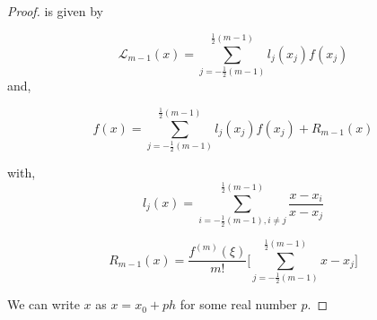 \documentclass[../document.tex]{subfiles}
\begin{document}
\begin{appendices}
\begin{proof}
			
			
			
			is given by
			
			
			\begin{equation} 
				\mathcal{L}_{m-1}(x) = 
				\sum_{ j=-\frac{1}{2}(m-1) }^{ \frac{1}{2}(m-1) } 
				l_j(x_j) f(x_j)
			\end{equation}
			and,
			
			\begin{equation} \label{main_eqn}
				f(x) =  
				\sum_{ j=-\frac{1}{2}(m-1) }^{ \frac{1}{2}(m-1) } 
				l_j(x_j) f(x_j) + R_{m-1}(x)
			\end{equation}
			
			
			with,
			\begin{equation*} 
				l_j(x) = 
				\sum_{i = -\frac{1}{2}(m-1) , i \neq j}^{\frac{1}{2}(m-1)} 
				\frac{x - x_i}{x - x_j}
			\end{equation*}
			
			\begin{equation*} 
				R_{m-1}(x) =  \frac{ f^{(m)}(\xi) }{ m! }
				\bigg[  
				\sum_{j = -\frac{1}{2}(m-1) }^{ \frac{1}{2}(m-1) } 
				x-x_j
				\bigg]
			\end{equation*}
			
			
			
			We can write $x$ as $x = x_0 + ph $ for some real number $p$.
			

\end{proof}
\end{appendices}
\end{document}
